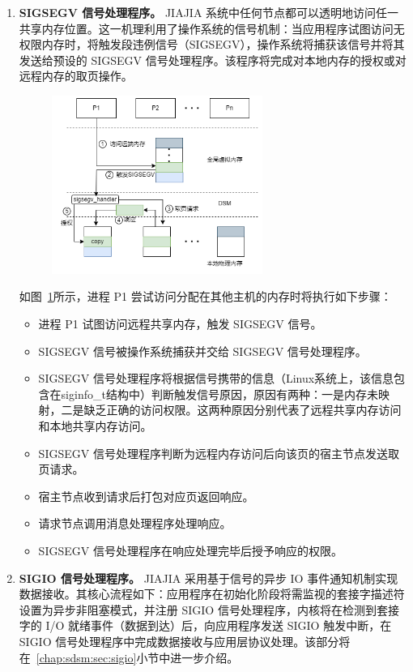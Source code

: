 {\begin{enumerate}[label=\arabic*.]
    \item \textbf{SIGSEGV 信号处理程序。} JIAJIA 系统中任何节点都可以透明地访问任一共享内存位置。这一机理利用了操作系统的信号机制：当应用程序试图访问无权限内存时，将触发段违例信号（SIGSEGV），操作系统将捕获该信号并将其发送给预设的 SIGSEGV 信号处理程序。该程序将完成对本地内存的授权或对远程内存的取页操作。
    \begin{figure}[!htbp]
        \centering
        \includegraphics[width=0.65\textwidth]{Img/jiajia-access.png}
        \label{fig:JIAJIA-access}
    \end{figure}
    如图~\ref{fig:JIAJIA-access}所示，进程 P1 尝试访问分配在其他主机的内存时将执行如下步骤：
    \begin{itemize}
        \item 进程 P1 试图访问远程共享内存，触发 SIGSEGV 信号。
        \item SIGSEGV 信号被操作系统捕获并交给 SIGSEGV 信号处理程序。
        \item SIGSEGV 信号处理程序将根据信号携带的信息（Linux系统上，该信息包含在siginfo\_t结构中）判断触发信号原因，原因有两种：一是内存未映射，二是缺乏正确的访问权限。这两种原因分别代表了远程共享内存访问和本地共享内存访问。
        \item SIGSEGV 信号处理程序判断为远程内存访问后向该页的宿主节点发送取页请求。
        \item 宿主节点收到请求后打包对应页返回响应。
        \item 请求节点调用消息处理程序处理响应。
        \item SIGSEGV 信号处理程序在响应处理完毕后授予响应的权限。
    \end{itemize}
    
    \item \textbf{SIGIO 信号处理程序。} JIAJIA 采用基于信号的异步 IO 事件通知机制实现数据接收。其核心流程如下：应用程序在初始化阶段将需监视的套接字描述符设置为异步非阻塞模式，并注册 SIGIO 信号处理程序，内核将在检测到套接字的 I/O 就绪事件（数据到达）后，向应用程序发送 SIGIO 触发中断，在 SIGIO 信号处理程序中完成数据接收与应用层协议处理。该部分将在~\ref{chap:sdsm:sec:sigio}小节中进一步介绍。


\end{enumerate}}
